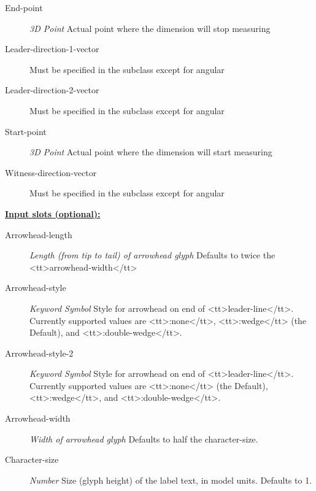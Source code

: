 \documentclass [11pt]{book}
\begin{document}
\begin{itemize}
\begin{description}
\item [End-point]
\emph{3D Point} Actual point where the dimension will stop measuring


\item [Leader-direction-1-vector]
Must be specified in the subclass except for angular


\item [Leader-direction-2-vector]
Must be specified in the subclass except for angular


\item [Start-point]
\emph{3D Point} Actual point where the dimension will start measuring


\item [Witness-direction-vector]
Must be specified in the subclass except for angular


\end{description}






\textbf{
\underline{Input slots (optional):}}

\begin{description}

\item [Arrowhead-length]
\emph{Length (from tip to tail) of arrowhead glyph} Defaults to twice the <tt>arrowhead-width</tt>


\item [Arrowhead-style]
\emph{Keyword Symbol} Style for arrowhead on end of <tt>leader-line</tt>. Currently supported values
are <tt>:none</tt>, <tt>:wedge</tt>  (the Default), and <tt>:double-wedge</tt>.


\item [Arrowhead-style-2]
\emph{Keyword Symbol} Style for arrowhead on end of <tt>leader-line</tt>. Currently supported values
are <tt>:none</tt> (the Default), <tt>:wedge</tt>, and <tt>:double-wedge</tt>.


\item [Arrowhead-width]
\emph{Width of arrowhead glyph} Defaults to half the character-size.


\item [Character-size]
\emph{Number} Size (glyph height) of the label text, in model units. Defaults to 1.



\end{description}
\end{itemize}
\end{document}
